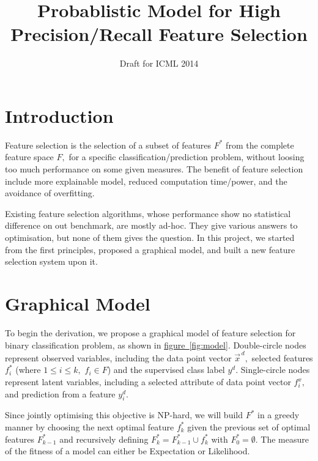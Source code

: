 \documentclass[11pt,a4paper]{article}
\begin{document}
\title{Probablistic Model for High Precision/Recall Feature Selection}
\author{Draft for ICML 2014}
\maketitle
\section{Introduction}
Feature selection is the selection of a subset of features $F^*$ from the complete feature space $F,$ for a specific classification/prediction problem, without loosing too much performance on some given measures. The benefit of feature selection include more explainable model, reduced computation time/power, and the avoidance of overfitting.

Existing feature selection algorithms, whose performance show no statistical difference on out benchmark, are mostly ad-hoc. They give various answers to optimisation, but none of them gives the question. In this project, we started from the first principles, proposed a graphical model, and built a new feature selection system upon it.

\section{Graphical Model}

To begin the derivation, we propose a graphical model of feature selection for binary classification problem, as shown in \hyperref[fig:model]{figure~\ref{fig:model}}. Double-circle nodes represent observed variables, including the data point vector $\vec{x}^{\,d},$ selected features $f_i^*$ (where $1\leq i\leq k,$ $f_i\in F$) and the supervised class label $y^d.$ Single-circle nodes represent latent variables, including a selected attribute of data point vector $f_i^x,$ and prediction from a feature $y^d_i.$ 

Since jointly optimising this objective is NP-hard, we will build $F^*$ in a greedy manner by choosing the next optimal feature $f^*_k$ given the previous set of optimal features $F^*_{k-1}$ and recursively defining $F^*_k = F^*_{k-1}\cup f^*_k$ with $F^*_0 = \emptyset$. The measure of the fitness of a model can either be Expectation or Likelihood.
\end{document}
